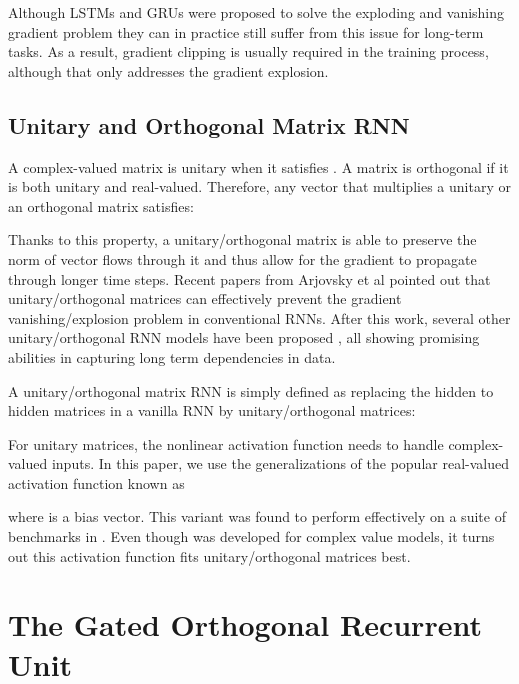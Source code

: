 \documentclass[letterpaper]{article} \usepackage{aaai18}  \usepackage{times}  \usepackage{helvet}  \usepackage{courier}  \usepackage{url}  \usepackage{graphicx}
\begin{document}
Although LSTMs and GRUs were proposed to solve the exploding and vanishing gradient problem \cite{hochreiter1991untersuchungen,bengio1994learning} they can in practice still suffer from this issue for long-term tasks. As a result, gradient clipping \cite{pascanu2013difficulty} is usually required in the training process, although that only addresses the gradient explosion. 

\subsection{Unitary and Orthogonal Matrix RNN}
A complex-valued matrix  is unitary when it satisfies . A matrix  is orthogonal if it is both unitary and real-valued. Therefore, any vector  that multiplies a unitary or an orthogonal matrix satisfies:
 
Thanks to this property, a unitary/orthogonal matrix is able to preserve the norm of vector flows through it and thus allow for the gradient to propagate through longer time steps. Recent papers from Arjovsky et al \cite{arjovsky2015unitary,henaff2016orthogonal} pointed out that unitary/orthogonal matrices can effectively prevent the gradient vanishing/explosion problem in conventional RNNs. After this work, several other unitary/orthogonal RNN models have been proposed \cite{jing2016tunable,wisdom2016full,hyland2016learning,mhammedi2016efficient}, all showing promising abilities in capturing long term dependencies in data.

A unitary/orthogonal matrix RNN is simply defined as replacing the hidden to hidden matrices in a vanilla RNN by unitary/orthogonal matrices:

For unitary matrices, the nonlinear activation function  needs to handle complex-valued inputs.
In this paper, we use the generalizations of the popular real-valued activation function  known as

where  is a bias vector.
This variant was found to perform effectively on a suite of benchmarks in \cite{arjovsky2015unitary,jing2016tunable}. Even though  was developed for complex value models, it turns out this activation function fits unitary/orthogonal matrices best. 














\section{The Gated Orthogonal Recurrent Unit}
\end{document}
